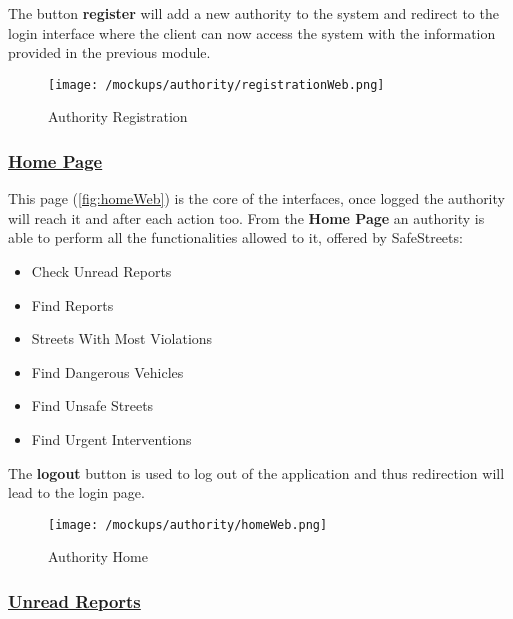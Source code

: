 				The button \textbf{register} will add a new authority to the system and redirect to the login interface where the client can now access the system with the information provided in the previous module.
				
				\newpage
				
				\begin{figure}[ht!]
					\centering
					\texttt{[image: /mockups/authority/registrationWeb.png]}
					\caption{\label{fig:registrationWeb} Authority Registration}
				\end{figure}
			
			\subsubsection[Home Page]{\hyperlink{toc}{Home Page}}
				\label{sec:authorityHomePage}
				
				This page (\autoref{fig:homeWeb}) is the core of the interfaces, once logged the authority will reach it and after each action too. From the \textbf{Home Page} an authority is able to perform all the functionalities allowed to it, offered by SafeStreets:
				
				\begin{itemize}
					\item Check Unread Reports
					\item Find Reports
					\item Streets With Most Violations
					\item Find Dangerous Vehicles
					\item Find Unsafe Streets
					\item Find Urgent Interventions
				\end{itemize}
			
				The \textbf{logout} button is used to log out of the application and thus redirection will lead to the login page.
				
				\newpage
				
				\begin{figure}[ht!]
					\centering
					\texttt{[image: /mockups/authority/homeWeb.png]}
					\caption{\label{fig:homeWeb} Authority Home}
				\end{figure}
			
			\subsubsection[Unread Reports]{\hyperlink{toc}{Unread Reports}}
				\label{sec:authorityCheckReports}
				
